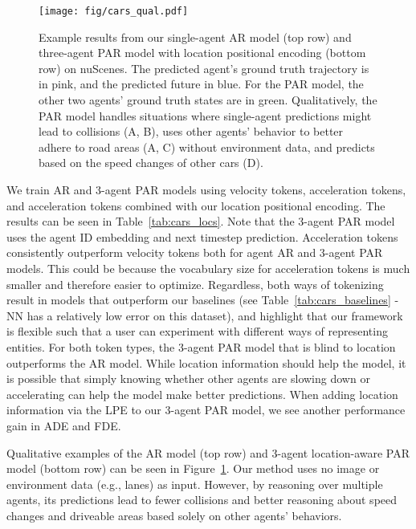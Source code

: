 \begin{figure}
    \centering
    \texttt{[image: fig/cars\_qual.pdf]}
    \caption{Example results from our single-agent AR model (top row) and three-agent PAR model with location positional encoding (bottom row) on nuScenes. The predicted agent's ground truth trajectory is in pink, and the predicted future in blue. For the PAR model, the other two agents' ground truth states are in green. Qualitatively, the PAR model handles situations where single-agent predictions might lead to collisions (A, B), uses other agents' behavior to better adhere to road areas (A, C) without environment data, and predicts based on the speed changes of other cars (D).}
    \label{fig:cars_qual}
    \vspace{-.6cm}
\end{figure}


We train AR and 3-agent PAR models using velocity tokens, acceleration tokens, and acceleration tokens combined with our location positional encoding. The results can be seen in Table~\ref{tab:cars_locs}. Note that the 3-agent PAR model uses the agent ID embedding and next timestep prediction.
Acceleration tokens consistently outperform velocity tokens both for agent AR and 3-agent PAR models. This could be because the vocabulary size for acceleration tokens is much smaller and therefore easier to optimize. Regardless, both ways of tokenizing result in models that outperform our baselines (see Table~\ref{tab:cars_baselines} - NN has a relatively low error on this dataset), and highlight that our framework is flexible such that a user can experiment with different ways of representing entities. For both token types, the 3-agent PAR model that is blind to location outperforms the AR model. While location information should help the model, it is possible that simply knowing whether other agents are slowing down or accelerating can help the model make better predictions.  When adding location information via the LPE to our 3-agent PAR model, we see another performance gain in ADE and FDE. 

Qualitative examples of the AR model (top row) and 3-agent location-aware PAR model (bottom row) can be seen in Figure~\ref{fig:cars_qual}. Our method uses no image or environment data (e.g., lanes) as input. However, by reasoning over multiple agents, its predictions lead to fewer collisions and better reasoning about speed changes and driveable areas based solely on other agents' behaviors.





